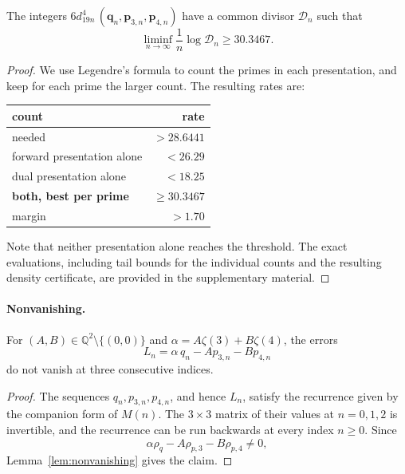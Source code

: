 \begin{lemma}\label{prop:z34-divisor}
The integers $6d_{19n}^{4}\,(\mathbf q_n,\mathbf p_{3,n},\mathbf p_{4,n})$ have a common divisor $\mathcal D_n$ such that
\[
\liminf_{n\to\infty}\frac1n\log\mathcal D_n\ge30.3467.
\]

\end{lemma}

\begin{proof}
We use Legendre's formula to count the primes in each presentation, and keep for each prime the larger count. The resulting rates are:
\begin{center}
\renewcommand{\arraystretch}{1.25}
\small
\begin{tabular}{lr}
\toprule
count & rate\\
\midrule
needed  & $>28.6441$\\
\midrule
forward presentation alone & $<26.29$\\
dual presentation alone & $<18.25$\\
\midrule
\textbf{both, best per prime} & $\boldsymbol{\ge30.3467}$\\
margin & $>1.70$\\
\bottomrule
\end{tabular}
\end{center}
Note that neither presentation alone reaches the threshold.
The exact evaluations, including tail bounds for the individual counts and the resulting density certificate, are provided in the supplementary material.
\end{proof}

\paragraph{Nonvanishing.}

\begin{lemma}\label{lem:z34-nonvanishing}
For $(A,B)\in\mathbb Q^2\setminus\{(0,0)\}$ and $\alpha=A\zeta(3)+B\zeta(4)$, the errors
\[
  L_n=\alpha\,q_n-Ap_{3,n}-Bp_{4,n}
\]
do not vanish at three consecutive indices.
\end{lemma}

\begin{proof}
The sequences $q_n,p_{3,n},p_{4,n}$, and hence $L_n$, satisfy the recurrence given by the companion form of $M(n)$. The $3\times3$ matrix of their values at $n=0,1,2$ is invertible, and the recurrence can be run backwards at every index $n\ge0$. Since
\[
\alpha\rho_q-A\rho_{p,3}-B\rho_{p,4}\ne0,
\] Lemma~\ref{lem:nonvanishing} gives the claim.
\end{proof}
